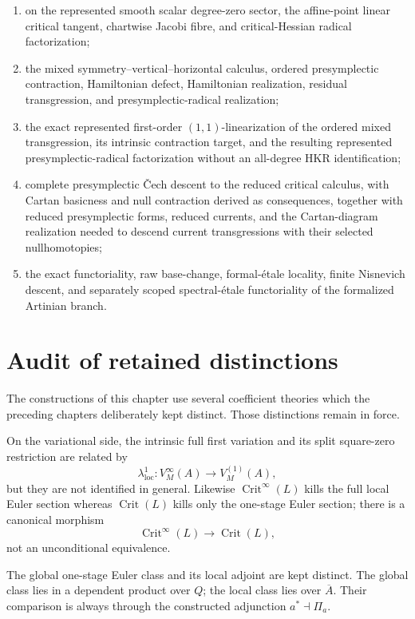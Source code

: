 \begin{enumerate}
\item on the represented smooth scalar degree-zero sector, the affine-point linear
      critical tangent, chartwise Jacobi fibre, and critical-Hessian radical
      factorization;
\item the mixed symmetry--vertical--horizontal calculus, ordered presymplectic
      contraction, Hamiltonian defect, Hamiltonian realization, residual
      transgression, and presymplectic-radical realization;
\item the exact represented first-order $(1,1)$-linearization of the ordered mixed
      transgression, its intrinsic contraction target, and the resulting represented
      presymplectic-radical factorization without an all-degree HKR identification;
\item complete presymplectic \v{C}ech descent to the reduced critical calculus,
      with Cartan basicness and null contraction derived as consequences, together
      with reduced presymplectic forms, reduced currents, and the Cartan-diagram
      realization needed to descend current transgressions with their selected
      nullhomotopies;
\item the exact functoriality, raw base-change, formal-\'etale locality, finite
      Nisnevich descent, and separately scoped spectral-\'etale functoriality of the
      formalized Artinian branch.
\end{enumerate}
\section{Audit of retained distinctions}
\label{sec:symmetry-noether-audit-of-retained-distinctions}

The constructions of this chapter use several coefficient theories which the
preceding chapters deliberately kept distinct.  Those distinctions remain in force.

On the variational side, the intrinsic full first variation and its split
square-zero restriction are related by
\[
\lambda^1_{\mathrm{loc}}:
V_M^\infty(A)\longrightarrow V_M^{(1)}(A),
\]
but they are not identified in general.  Likewise
$\operatorname{Crit}^{\infty}(L)$ kills the full local Euler section whereas
$\operatorname{Crit}(L)$ kills only the one-stage Euler section; there is a
canonical morphism
\[
\operatorname{Crit}^{\infty}(L)\longrightarrow\operatorname{Crit}(L),
\]
not an unconditional equivalence.

The global one-stage Euler class and its local adjoint are kept distinct.  The
global class lies in a dependent product over $Q$; the local class lies over
$\overline A$.  Their comparison is always through the constructed adjunction
$a^*\dashv\Pi_a$.

